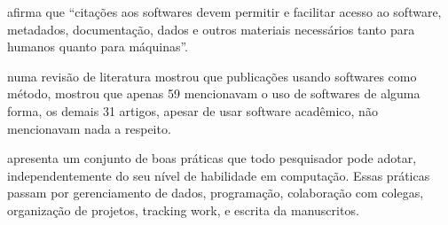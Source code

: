  afirma que ``citações aos softwares devem
permitir e facilitar acesso ao software, metadados, documentação, dados e
outros materiais necessários tanto para humanos quanto para máquinas''.


numa revisão de literatura mostrou que publicações usando softwares como
método, mostrou que apenas 59 mencionavam o uso de softwares de alguma forma,
os demais 31 artigos, apesar de usar software acadêmico, não mencionavam nada a
respeito.

 apresenta um conjunto de boas práticas que todo
pesquisador pode adotar, independentemente do seu nível de habilidade em
computação. Essas práticas passam por gerenciamento de dados, programação,
colaboração com colegas, organização de projetos, tracking work, e escrita da
manuscritos.






